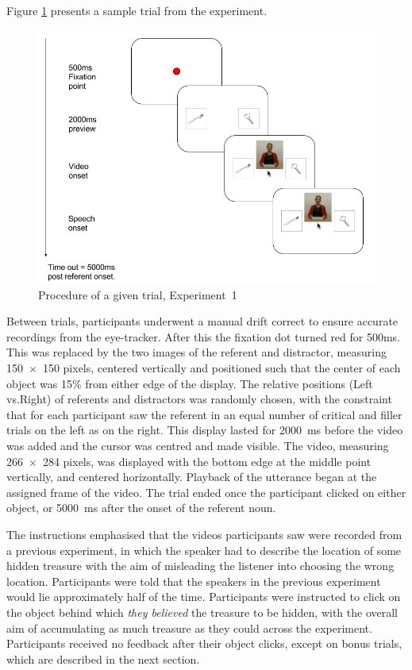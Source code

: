 \documentclass[a4paper,man,natbib]{apa6}
\begin{document}
Figure \ref{fig:v1_trial} presents a sample trial from the experiment. 
\begin{figure}[Ht]
  \centering
	\includegraphics[width=\linewidth]{./img/e7_trial.png}
  \caption{Procedure of a given trial, Experiment~1}
  \label{fig:v1_trial}
\end{figure}
Between trials, participants underwent a manual drift correct to ensure accurate recordings from the eye-tracker.
After this the fixation dot turned red for 500ms. 
This was replaced by the two images of the referent and distractor, measuring 150~$\times$~150 pixels, centered vertically and positioned such that the center of each object was 15\% from either edge of the display. 
The relative positions (Left vs.\@ Right) of referents and distractors was randomly chosen, with the constraint that for each participant saw the referent in an equal number of critical and filler trials on the left as on the right.
This display lasted for 2000~ms before the video was added and the cursor was centred and made visible.
The video, measuring 266~$\times$~284 pixels, was displayed with the bottom edge at the middle point vertically, and centered horizontally.
Playback of the utterance began at the assigned frame of the video.
The trial ended once the participant clicked on either object, or 5000~ms after the onset of the referent noun.

The instructions emphasised that the videos participants saw were recorded from a previous experiment, in which the speaker had to describe the location of some hidden treasure with the aim of misleading the listener into choosing the wrong location.
Participants were told that the speakers in the previous experiment would lie approximately half of the time. 
Participants were instructed to click on the object behind which \textit{they believed} the treasure to be hidden, with the overall aim of accumulating as much treasure as they could across the experiment.
Participants received no feedback after their object clicks, except on bonus trials, which are described in the next section.
\end{document}
